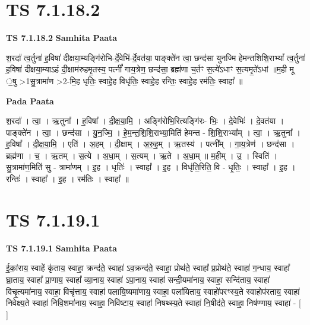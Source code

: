 \documentclass[17pt]{extarticle}
\begin{document}
\section*{ TS 7.1.18.2 }

\textbf{TS 7.1.18.2 } \newline
\textbf{Samhita Paata} \newline

श॒रदा᳚ त्व॒र्तुना॑ ह॒विषा॑ दीक्षया॒म्यङ्गि॑रोभि-र्दे॒वेभि॑-र्दे॒वत॑या॒ पाङ्क्ते॑न त्वा॒ छन्द॑सा युनज्मि हेमन्तशिशि॒राभ्यां᳚ त्व॒र्तुना॑ ह॒विषा॑ दीक्षया॒म्याऽहं दी॒क्षाम॑रुहमृ॒तस्य॒ पत्नीं᳚ गाय॒त्रेण॒ छन्द॑सा॒ ब्रह्म॑णा च॒र्तꣳ स॒त्ये॑ऽधाꣳ स॒त्यमृ॒ते॑ऽधां ॥म॒ही मू ॒षु >1सु॒त्रामा॑ण >2-मि॒ह धृतिः॒ स्वाहे॒ह विधृ॑तिः॒ स्वाहे॒ह रन्तिः॒ स्वाहे॒ह रम॑तिः॒ स्वाहा᳚ ॥ \newline

\textbf{Pada Paata} \newline

श॒रदा᳚ । त्वा॒ । ऋ॒तुना᳚ । ह॒विषा᳚ । दी॒क्ष॒या॒मि॒ । अङ्गि॑रोभि॒रित्यङ्गि॑रः- भिः॒ । दे॒वेभिः॑ । दे॒वत॑या । पाङ्क्ते॑न । त्वा॒ । छन्द॑सा । यु॒न॒ज्मि॒ । हे॒म॒न्त॒शि॒शि॒राभ्या॒मिति॑ हेमन्त - शि॒शि॒राभ्या᳚म् । त्वा॒ । ऋ॒तुना᳚ । ह॒विषा᳚ । दी॒क्ष॒या॒मि॒ । एति॑ । अ॒हम् । दी॒क्षाम् । अ॒रु॒ह॒म् । ऋ॒तस्य॑ । पत्नी᳚म् । गा॒य॒त्रेण॑ । छन्द॑सा । ब्रह्म॑णा । च॒ । ऋ॒तम् । स॒त्ये । अ॒धा॒म् । स॒त्यम् । ऋ॒ते । अ॒धा॒म् ॥ म॒हीम् । उ॒ । स्विति॑ । सु॒त्रामा॑ण॒मिति॑ सु - त्रामा॑णम् । इ॒ह । धृतिः॑ । स्वाहा᳚ । इ॒ह । विधृ॑ति॒रिति॒ वि - धृ॒तिः॒ । स्वाहा᳚ । इ॒ह । रन्तिः॑ । स्वाहा᳚ । इ॒ह । रम॑तिः । स्वाहा᳚ ॥  \newline




\section*{ TS 7.1.19.1 }

\textbf{TS 7.1.19.1 } \newline
\textbf{Samhita Paata} \newline

ई॒कां॒राय॒ स्वाहें कृ॑ताय॒ स्वाहा॒ क्रन्द॑ते॒ स्वाहा॑ ऽव॒क्रन्द॑ते॒ स्वाहा॒ प्रोथ॑ते॒ स्वाहा᳚ प्र॒प्रोथ॑ते॒ स्वाहा॑ ग॒न्धाय॒ स्वाहा᳚ घ्रा॒ताय॒ स्वाहा᳚ प्रा॒णाय॒ स्वाहा᳚ व्या॒नाय॒ स्वाहा॑ ऽपा॒नाय॒ स्वाहा॑ सन्दी॒यमा॑नाय॒ स्वाहा॒ सन्दि॑ताय॒ स्वाहा॑ विचृ॒त्यमा॑नाय॒ स्वाहा॒ विचृ॑त्ताय॒ स्वाहा॑ पलायि॒ष्यमा॑णाय॒ स्वाहा॒ पला॑यिताय॒ स्वाहो॑परꣳस्य॒ते स्वाहोप॑रताय॒ स्वाहा॑ निवेक्ष्य॒ते स्वाहा॑ निवि॒शमा॑नाय॒ स्वाहा॒ निवि॑ष्टाय॒ स्वाहा॑ निषथ्स्य॒ते स्वाहा॑ नि॒षीद॑ते॒ स्वाहा॒ निष॑ण्णाय॒ स्वाहा॑ - [  ] \newline
\end{document}
